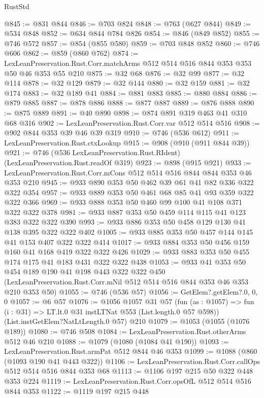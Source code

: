 \begin{lexlean}{RustStd}
\begin{coremodule}
@845 := @831 @844
@846 := @703 @824
@848 := @763 (@627 @844)
@849 := @534 @848
@852 := @634 @844 @784 @826
@854 := @846 (@849 @852)
@855 := @746 @572
@857 := @854 (@855 @580)
@859 := @703 @848 @852
@860 := @746 @606
@862 := @859 (@860 @762)
@874 := LexLeanPreservation.Rust.Corr.matchArms @512 @514 @516 @844 @353 @353 @50 @46 @353 @55 @210
@875 := @32 @68
@876 := @32 @99
@877 := @32 @114
@878 := @32 @129
@879 := @32 @144
@880 := @32 @159
@881 := @32 @174
@883 := @32 @189 @41
@884 := @881 @883
@885 := @880 @884
@886 := @879 @885
@887 := @878 @886
@888 := @877 @887
@889 := @876 @888
@890 := @875 @889
@891 := @40 @890
@898 := @874 @891 @319 @463 @41 @310 @68 @316
@902 := LexLeanPreservation.Rust.Corr.var @512 @514 @516
@908 := @902 @844 @353 @39 @46 @39 @319
@910 := @746 (@536 @612)
@911 := LexLeanPreservation.Rust.ctxLookup
@915 := @908 (@910 (@911 @844 @39))
@921 := @746 (@536 LexLeanPreservation.Rust.RIdent) (LexLeanPreservation.Rust.readOf @319)
@923 := @898 (@915 @921)
@933 := LexLeanPreservation.Rust.Corr.mCons @512 @514 @516 @844 @844 @353 @46 @353 @210
@945 := @933 @890 @353 @50 @462 @39 @61 @41 @82 @336 @322 @322 @354
@957 := @933 @889 @353 @50 @461 @68 @85 @41 @93 @359 @322 @322 @366
@969 := @933 @888 @353 @50 @460 @99 @100 @41 @108 @371 @322 @322 @378
@981 := @933 @887 @353 @50 @459 @114 @115 @41 @123 @383 @322 @322 @390
@993 := @933 @886 @353 @50 @458 @129 @130 @41 @138 @395 @322 @322 @402
@1005 := @933 @885 @353 @50 @457 @144 @145 @41 @153 @407 @322 @322 @414
@1017 := @933 @884 @353 @50 @456 @159 @160 @41 @168 @419 @322 @322 @426
@1029 := @933 @883 @353 @50 @455 @174 @175 @41 @183 @431 @322 @322 @438
@1053 := @933
    @41
    @353
    @50
    @454
    @189
    @190
    @41
    @198
    @443
    @322
    @322
    @450
    (LexLeanPreservation.Rust.Corr.mNil @512 @514 @516 @844 @353 @46 @353 @210 @353 @50)
@1055 := @746 (@536 @57)
@1056 := GetElem?.getElem?.{0, 0, 0}
@1057 := @6 @57
@1076 := @1056
    @1057
    @31
    @57
    (fun (as : @1057) => fun (i : @31) => LT.lt.{0} @31 instLTNat @553 (List.length.{0} @57 @598))
    (List.instGetElem?NatLtLength.{0} @57)
    @210
@1079 := @1053 (@1055 (@1076 @189))
@1080 := @746 @508
@1084 := LexLeanPreservation.Rust.otherArms @512 @46 @210
@1088 := @1079 (@1080 (@1084 @41 @190))
@1093 := LexLeanPreservation.Rust.armPat @512 @844 @46 @353
@1099 := @1088 (@860 (@1093 @190 @41 @443 @322))
@1106 := LexLeanPreservation.Rust.Corr.callOps @512 @514 @516 @844 @353 @68
@1113 := @1106 @197 @215 @50 @322 @448 @353 @224
@1119 := LexLeanPreservation.Rust.Corr.opsOfL @512 @514 @516 @844 @353
@1122 := @1119 @197 @215 @448

\end{coremodule}
\end{lexlean}
